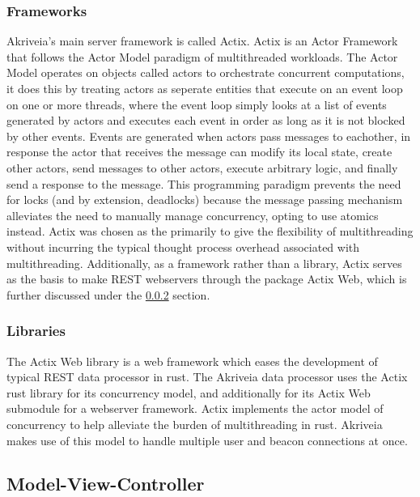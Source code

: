 \subsubsection{Frameworks}
Akriveia's main server framework is called Actix.
Actix is an Actor Framework that follows the Actor Model paradigm of multithreaded workloads.
The Actor Model operates on objects called actors to orchestrate concurrent computations, it does this by treating actors as seperate entities that execute on an event loop on one or more threads, where the event loop simply looks at a list of events generated by actors and executes each event in order as long as it is not blocked by other events.
Events are generated when actors pass messages to eachother, in response the actor that receives the message can modify its local state, create other actors, send messages to other actors, execute arbitrary logic, and finally send a response to the message.
This programming paradigm prevents the need for locks (and by extension, deadlocks) because the message passing mechanism alleviates the need to manually manage concurrency, opting to use atomics instead.
\smallskip
Actix was chosen as the primarily to give the flexibility of multithreading without incurring the typical thought process overhead associated with multithreading. Additionally, as a framework rather than a library, Actix serves as the basis to make REST webservers through the package Actix Web, which is further discussed under the \ref{software_libraries} section.

\subsubsection{Libraries}
\label{software_libraries}
The Actix Web library is a web framework which eases the development of typical REST data processor in rust.
The Akriveia data processor uses the Actix rust library for its concurrency model, and additionally for its Actix Web submodule for a webserver framework.
Actix implements the actor model of concurrency to help alleviate the burden of multithreading in rust.
Akriveia makes use of this model to handle multiple user and beacon connections at once.


\subsection{Model-View-Controller}


